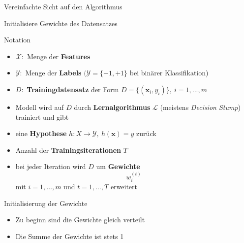 \documentclass[hyperref={bookmarks=false},11pt,dvipsnames]{beamer}
\begin{document}
\begin{frame}{Vereinfachte Sicht auf den Algorithmus}
	\begin{algorithm}[H]
		\DontPrintSemicolon
		\LinesNotNumbered
		\BlankLine
		Initialisiere Gewichte des Datensatzes\;
	\end{algorithm}
\end{frame}

\begin{frame}[t]{Notation}
	\begin{itemize}
		\item <1-> $\mathcal{X}:$ Menge der \textbf{Features}
		\item <2-> $\mathcal{Y}:$ Menge der \textbf{Labels} $(\mathcal{Y}=\{-1,+1\}$ bei binärer Klassifikation)
		\item <3-> $D:$ \textbf{Trainingdatensatz} der Form $D=\{(\boldsymbol{x}_i,y_i)\},~i=1,...,m$
		\item <4-> Modell wird auf $D$ durch \textbf{Lernalgorithmus} $\mathcal{L}$ (meistens \emph{Decision Stump}) trainiert und gibt
		\item <5-> eine \textbf{Hypothese} $h:X\rightarrow\mathcal{Y},~h(\boldsymbol{x})=y$ zurück
		\item <6-> Anzahl der \textbf{Trainingsiterationen} $T$
		\item <7-> bei jeder Iteration wird $D$ um \textbf{Gewichte} $$w^{(t)}_i$$ mit $i=1,\dots,m$ und $t=1,\dots,T$ erweitert
	\end{itemize}
\end{frame}

\begin{frame}[t]{Initialisierung der Gewichte}
	\begin{itemize}
		\item <1-> Zu beginn sind die Gewichte gleich verteilt 
		\item <2-> Die Summe der Gewichte ist stets 1 
	\end{itemize}
\end{frame}
\end{document}
